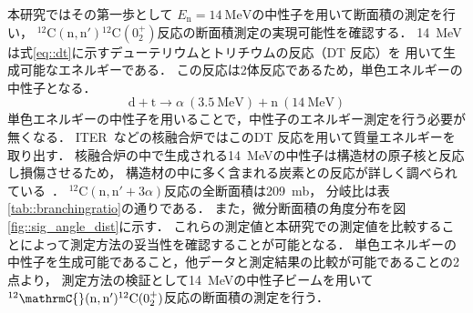 \documentclass[../master]{subfiles}
\begin{document}
本研究ではその第一歩として
$E_{\text{n}} = \SI{14}{\mega\electronvolt}$の中性子を用いて断面積の測定を行い，
${}^{12}\mathrm{C}(\mathrm{n},\mathrm{n}'){}^{12}\mathrm{C} (0_2^+)$反応の断面積測定の実現可能性を確認する．
\SI{14}{\mega\electronvolt}は式\eqref{eq::dt}に示すデューテリウムとトリチウムの反応（DT 反応）を
用いて生成可能なエネルギーである．
この反応は2体反応であるため，単色エネルギーの中性子となる．
\begin{equation}
  \mathrm{d} + \mathrm{t} \rightarrow \alpha\ (\SI{3.5}{\mega\electronvolt}) + \mathrm{n}\ (\SI{14}{\mega\electronvolt})
  \label{eq::dt}
\end{equation}
単色エネルギーの中性子を用いることで，中性子のエネルギー測定を行う必要が無くなる．
ITER~\cite{iter}などの核融合炉ではこのDT 反応を用いて質量エネルギーを取り出す．
核融合炉の中で生成される\SI{14}{\mega\electronvolt}の中性子は構造材の原子核と反応し損傷させるため，
構造材の中に多く含まれる炭素との反応が詳しく調べられている~\cite{takahashietal,kondoetal}．
${}^{12}\mathrm{C}(\mathrm{n},\mathrm{n}'+3\alpha)$反応の全断面積は\SI{209}{\milli\barn}，
分岐比は表\ref{tab::branchingratio}の通りである．
また，微分断面積の角度分布を図\ref{fig::sig_angle_dist}に示す．
これらの測定値と本研究での測定値を比較することによって測定方法の妥当性を確認することが可能となる．
単色エネルギーの中性子を生成可能であること，他データと測定結果の比較が可能であることの2点より，
測定方法の検証として\SI{14}{\mega\electronvolt}の中性子ビームを用いて
${}^{12}\mathrmC{}(\mathrm{n},\mathrm{n}'){}^{12}\mathrm{C}(0_2^+)$反応の断面積の測定を行う．
\end{document}
